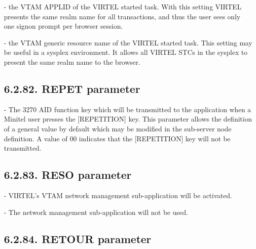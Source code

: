 \documentclass[letterpaper,10pt,english]{sphinxmanual}
\begin{document}
 - the VTAM APPLID of the VIRTEL started task. With this setting VIRTEL presents the same realm name for all transactions, and thus the user sees only one signon prompt per browser session.

 - the VTAM generic resource name of the VIRTEL started task. This setting may be useful in a sysplex environment. It allows all VIRTEL STCs in the sysplex to present the same realm name to the browser.


\subsection{6.2.82. REPET parameter}
\label{\detokenize{Installation_Guide:repet-parameter}}
\begin{sphinxVerbatim}[commandchars=\\\{\}]
  
\end{sphinxVerbatim}

 - The 3270 AID function key which will be transmitted to the application when a Minitel user presses the {[}REPETITION{]} key. This parameter allows the definition of a general value by default which may be modified in the sub-server node definition. A value of 00 indicates that the {[}REPETITION{]} key will not be transmitted.


\subsection{6.2.83. RESO parameter}
\label{\detokenize{Installation_Guide:reso-parameter}}
\begin{sphinxVerbatim}[commandchars=\\\{\}]
 
\end{sphinxVerbatim}

 - VIRTEL’s VTAM network management sub-application will be activated.

 - The network management sub-application will not be used.


\subsection{6.2.84. RETOUR parameter}
\label{\detokenize{Installation_Guide:retour-parameter}}
\begin{sphinxVerbatim}[commandchars=\\\{\}]
 
\end{sphinxVerbatim}
\end{document}
